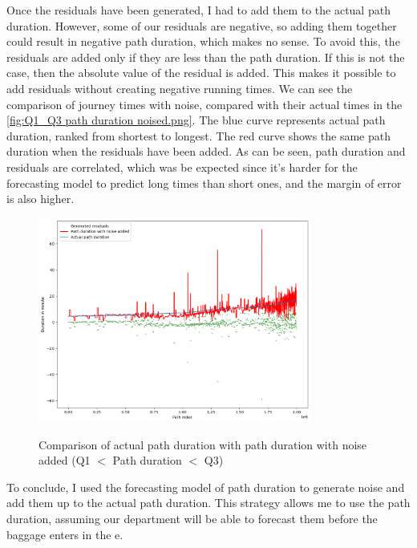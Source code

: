 \documentclass[12pt]{article}
\begin{document}
Once the residuals have been generated, I had to add them to the actual path duration. However, some of our residuals are negative, so adding them together could result in negative path duration, which makes no sense. To avoid this, the residuals are added only if they are less than the path duration. If this is not the case, then the absolute value of the residual is added. This makes it possible to add residuals without creating negative running times. We can see the comparison of journey times with noise, compared with their actual times in the \autoref{fig:Q1_Q3 path duration noised.png}. The blue curve represents actual path duration, ranked from shortest to longest. The red curve shows the same path duration when the residuals have been added. As can be seen, path duration and residuals are correlated, which was be expected since it's harder for the forecasting model to predict long times than short ones, and the margin of error is also higher.

\FloatBarrier
\begin{figure}[h]
    \centering
    \includegraphics[width=0.8\textwidth]{Q1_Q3 path duration noised.png}\\
    \caption{Comparison of actual path duration with path duration with noise added (Q1 $<$ Path duration $<$ Q3)}
    \label{fig:Q1_Q3 path duration noised.png}
\end{figure}
\FloatBarrier

To conclude, I used the forecasting model of path duration to generate noise and add them up to the actual path duration. This strategy allows me to use the path duration, assuming our department will be able to forecast them before the baggage enters in the \acrshort{e}.

\newpage
\end{document}
